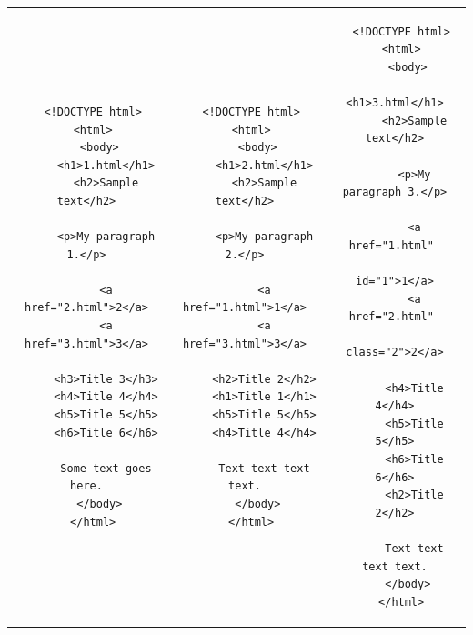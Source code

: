 \documentclass[]{article}
\begin{document}
\noindent
\begin{tabular}{ccc}
\begin{lstlisting}
  <!DOCTYPE html>
  <html>
    <body>
      <h1>1.html</h1>
      <h2>Sample text</h2>
      
      <p>My paragraph 1.</p>

      <a href="2.html">2</a>
      <a href="3.html">3</a>

      <h3>Title 3</h3>
      <h4>Title 4</h4>
      <h5>Title 5</h5>
      <h6>Title 6</h6>

      Some text goes here.
    </body>
  </html>
\end{lstlisting}&
\begin{lstlisting}
  <!DOCTYPE html>
  <html>
    <body>
      <h1>2.html</h1>
      <h2>Sample text</h2>
      
      <p>My paragraph 2.</p>

      <a href="1.html">1</a>
      <a href="3.html">3</a>

      <h2>Title 2</h2>
      <h1>Title 1</h1>
      <h5>Title 5</h5>
      <h4>Title 4</h4>

      Text text text text.
    </body>
  </html>
\end{lstlisting}&
\begin{lstlisting}
  <!DOCTYPE html>
  <html>
    <body>
      <h1>3.html</h1>
      <h2>Sample text</h2>
      
      <p>My paragraph 3.</p>

      <a href="1.html" 
          id="1">1</a>
      <a href="2.html" 
          class="2">2</a>

      <h4>Title 4</h4>
      <h5>Title 5</h5>
      <h6>Title 6</h6>
      <h2>Title 2</h2>

      Text text text text.
    </body>
  </html>
\end{lstlisting}
\end{tabular} 
\end{document}
